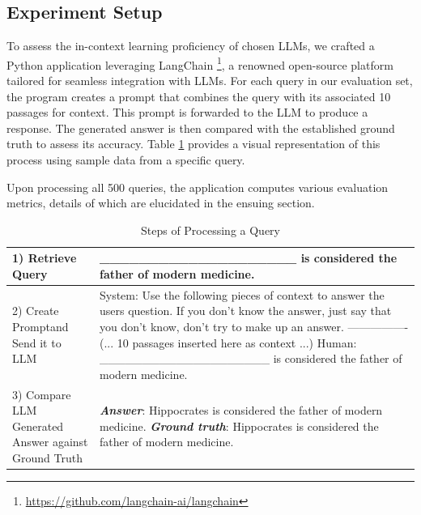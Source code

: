\documentclass[conference]{IEEEtran}
\begin{document}
\subsection{Experiment Setup}
To assess the in-context learning proficiency of chosen LLMs, we crafted a Python application leveraging LangChain \footnote{\url{https://github.com/langchain-ai/langchain}}, a renowned open-source platform tailored for seamless integration with LLMs. For each query in our evaluation set, the program creates a prompt that combines the query with its associated 10 passages for context. This prompt is forwarded to the LLM to produce a response. The generated answer is then compared with the established ground truth to assess its accuracy. Table \ref{query-processing} provides a visual representation of this process using sample data from a specific query.

Upon processing all 500 queries, the application computes various evaluation metrics, details of which are elucidated in the ensuing section. 

\begin{table}
    \renewcommand{\arraystretch}{1.5}
    \centering
    \caption{Steps of Processing a Query}
    \label{tab:the_table}
    \begin{tabular}{|p{40mm}|p{120mm}|}
        \hline
        1) Retrieve Query & \_\_\_\_\_\_\_\_\_\_\_\_\_\_\_\_\_\_\_\_ is considered the father of modern medicine.  \\
        \hline
        2) Create Prompt\newline and Send it to LLM & System: Use the following pieces of context to answer the users question. 
If you don't know the answer, just say that you don't know, don't try to make up an answer.\newline
----------------\newline
(... 10 passages inserted here as context ...)\newline
Human: \_\_\_\_\_\_\_\_\_\_\_\_\_\_\_\_\_\_\_\_ is considered the father of modern medicine.  \\
        \hline
        3) Compare LLM Generated Answer against Ground Truth & \textbf{\textit{Answer}}: Hippocrates is considered the father of modern medicine.  \newline 
        \newline 
        \textbf{\textit{Ground truth}}: Hippocrates is considered the father of modern medicine.  \\
        \hline
        
    \end{tabular}
\label{query-processing}  
\end{table}
\end{document}
